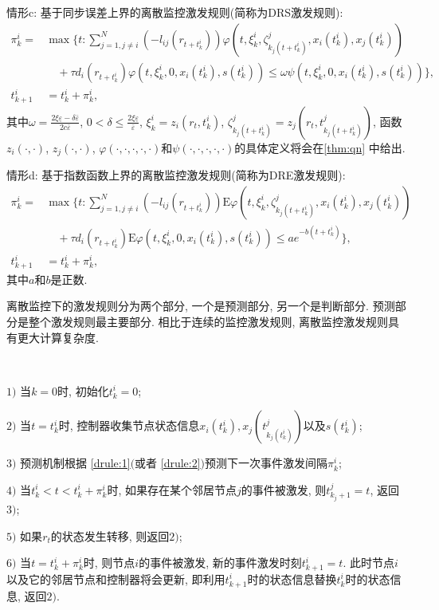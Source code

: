         情形c: 基于同步误差上界的离散监控激发规则(简称为DRS激发规则):
        \begin{align}\label{drule:1}
            \nonumber \pi^{i}_{k}=&\max\Big\{t:
            \sum^N_{j=1,j\neq i}(-l_{ij}(r_{t+t^i_k}))\varphi(t,\xi^i_k,\zeta^j_{k_j(t+t^i_k)},x_i(t^i_k),x_j(t^i_k))\\
             &\quad+\tau d_i(r_{t+t^i_k})\varphi(t,\xi^i_k,0,x_i(t^i_k),s(t^i_k))
            \leq\omega \psi(t,\xi^i_k,0,x_i(t^i_k),s(t^i_k))\Big\},\\
           \nonumber t_{k+1}^i&=t_{k}^i+\pi^{i}_{k},
            \end{align}
        其中$\omega=\frac{2\xi\underline{\varepsilon}-\delta\bar{\varepsilon}}{2c\bar{\varepsilon}}$, $0<\delta\leq\frac{2\xi\underline{\varepsilon}}{\bar{\varepsilon}}$, $\xi^i_k=z_i(r_t,t^i_k)$, $\zeta^j_{k_j(t+t^i_k)}=z_j(r_t,t^j_{k_j(t+t^i_k)})$, 函数$z_i(\cdot,\cdot)$, $z_j(\cdot,\cdot)$, $\varphi(\cdot,\cdot,\cdot,\cdot,\cdot)$和$\psi(\cdot,\cdot,\cdot,\cdot,\cdot)$的具体定义将会在\autoref{thm:qn} 中给出.

        情形d: 基于指数函数上界的离散监控激发规则(简称为DRE激发规则):
        \begin{align}\label{drule:2}
             \nonumber \pi^{i}_{k}=&\max\Big\{t:
            \sum^N_{j=1,j\neq i}(-l_{ij}(r_{t+t^i_k}))\mathrm{E}\varphi(t,\xi^i_k,\zeta^j_{k_j(t+t^i_k)},x_i(t^i_k),x_j(t^i_k))\\
            &\quad+\tau d_i(r_{t+t^i_k})\mathrm{E}\varphi(t,\xi^i_k,0,x_i(t^i_k),s(t^i_k))
            \leq ae^{-b(t+t^i_k)}\Big\},\\
            \nonumber t_{k+1}^i&=t_{k}^i+\pi^{i}_{k},
            \end{align}
        其中$a$和$b$是正数.
        \begin{rem}
            离散监控下的激发规则分为两个部分, 一个是预测部分, 另一个是判断部分. 预测部分是整个激发规则最主要部分. 相比于连续的监控激发规则, 离散监控激发规则具有更大计算复杂度.
        \end{rem}
            \begin{algo}[离散监控事件激发算法]\label{algo2}~~

            $1)$ 当$k=0$时, 初始化$t^i_k=0$;

            $2)$ 当$t=t^i_k$时, 控制器收集节点状态信息$x_i(t_k^i), x_j(t^j_{k_j(t_k^i)})$以及$s(t_k^i)$;

            $3)$ 预测机制根据 \eqref{drule:1}$($或者 \eqref{drule:2}$)$预测下一次事件激发间隔$\pi_k^i$;

            $4)$ 当$t_k^i<t<t^i_k+\pi^i_k$时, 如果存在某个邻居节点$j$的事件被激发, 则$t^j_{k_j+1}=t$, 返回$3)$;

            $5)$ 如果$r_t$的状态发生转移, 则返回$2)$;

            $6)$ 当$t=t^i_k+\pi^i_k$时, 则节点$i$的事件被激发, 新的事件激发时刻$t_{k+1}^i=t$. 此时节点$i$以及它的邻居节点和控制器将会更新, 即利用$t^i_{k+1}$时的状态信息替换$t^i_k$时的状态信息, 返回$2)$.
             \end{algo}


